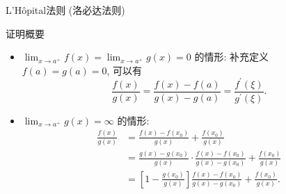 \documentclass[
10pt,
aspectratio=43,
]{beamer}
\begin{document}
\begin{frame}{L'Hôpital法则 (洛必达法则)}
	\begin{exampleblock}{证明概要}
		\begin{itemize}
			\item $\displaystyle\lim _{x \rightarrow a^{+}} f(x)=\lim _{x \rightarrow a^{+}} g(x)=0$ 的情形: 补充定义 $f(a)=g(a)=0$, 可以有
			      $$
				      \frac{f(x)}{g(x)}=\frac{f(x)-f(a)}{g(x)-g(a)}=\frac{f^{\prime}(\xi)}{g^{\prime}(\xi)} .
			      $$
			\item $\displaystyle\lim _{x \rightarrow a^{+}} g(x)=\infty$ 的情形:
			      $$
				      \begin{aligned}
					      \frac{f(x)}{g(x)} & =\frac{f(x)-f\left(x_0\right)}{g(x)}+\frac{f\left(x_0\right)}{g(x)}                                                                   \\
					                        & =\frac{g(x)-g\left(x_0\right)}{g(x)} \cdot \frac{f(x)-f\left(x_0\right)}{g(x)-g\left(x_0\right)}+\frac{f\left(x_0\right)}{g(x)}       \\
					                        & =\left[1-\frac{g\left(x_0\right)}{g(x)}\right] \frac{f(x)-f\left(x_0\right)}{g(x)-g\left(x_0\right)}+\frac{f\left(x_0\right)}{g(x)} .
				      \end{aligned}
			      $$
		\end{itemize}
	\end{exampleblock}
\end{frame}
\end{document}
